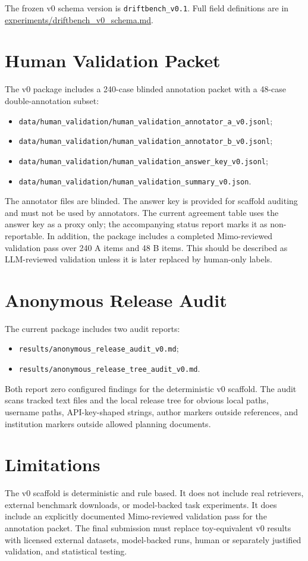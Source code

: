 \documentclass[10pt]{article}
\begin{document}
The frozen v0 schema version is \texttt{driftbench\_v0.1}. Full field definitions are in
\url{experiments/driftbench_v0_schema.md}.

\section{Human Validation Packet}

The v0 package includes a 240-case blinded annotation packet with a 48-case double-annotation subset:

\begin{itemize}
    \item \texttt{data/human\_validation/human\_validation\_annotator\_a\_v0.jsonl};
    \item \texttt{data/human\_validation/human\_validation\_annotator\_b\_v0.jsonl};
    \item \texttt{data/human\_validation/human\_validation\_answer\_key\_v0.jsonl};
    \item \texttt{data/human\_validation/human\_validation\_summary\_v0.json}.
\end{itemize}

The annotator files are blinded. The answer key is provided for scaffold auditing and must not be used by annotators. The current agreement table uses the answer key as a proxy only; the accompanying status report marks it as non-reportable. In addition, the package includes a completed Mimo-reviewed validation pass over 240 A items and 48 B items. This should be described as LLM-reviewed validation unless it is later replaced by human-only labels.

\section{Anonymous Release Audit}

The current package includes two audit reports:

\begin{itemize}
    \item \texttt{results/anonymous\_release\_audit\_v0.md};
    \item \texttt{results/anonymous\_release\_tree\_audit\_v0.md}.
\end{itemize}

Both report zero configured findings for the deterministic v0 scaffold. The audit scans tracked text files and the local release tree for obvious local paths, username paths, API-key-shaped strings, author markers outside references, and institution markers outside allowed planning documents.

\section{Limitations}

The v0 scaffold is deterministic and rule based. It does not include real retrievers, external benchmark downloads, or model-backed task experiments. It does include an explicitly documented Mimo-reviewed validation pass for the annotation packet. The final submission must replace toy-equivalent v0 results with licensed external datasets, model-backed runs, human or separately justified validation, and statistical testing.
\end{document}
